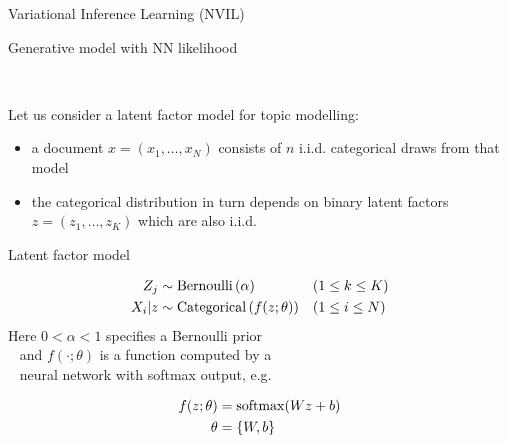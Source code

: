 

\begin{frame}{Variational Inference Learning (NVIL)}

Generative model with NN likelihood
\pause

~

Let us consider a latent factor model for topic modelling: \pause

\begin{itemize}
	\item a document $ x = (x_{1},\ldots,x_{N})$ consists of $ n $ i.i.d. categorical draws from that model \pause
	\item the categorical distribution in turn depends on  binary latent factors $ z = (z_{1},\ldots,z_{K}) $ which are also i.i.d. 
\end{itemize}


\end{frame}

\begin{frame}{Latent factor model}

\begin{equation*}
\begin{aligned}
Z_{j} &\sim \operatorname{Bernoulli}\left(\alpha\right) && (1 \leq k \leq K) \\ 
X_{i}|z &\sim \operatorname{Categorical}\left(f(z; \theta)\right) && (1 \leq i \leq N)
\end{aligned}
\end{equation*} 
Here $0 < \alpha < 1$ specifies a Bernoulli prior \\
~ and $ f(\cdot; \theta) $ is a function computed by a \\
~ neural network with softmax output, e.g.

\begin{equation*}
\begin{aligned}
f(z; \theta) &= \operatorname{softmax}(Wz + b) \\
\theta &= \{W, b\}
\end{aligned}
\end{equation*}

\end{frame}

